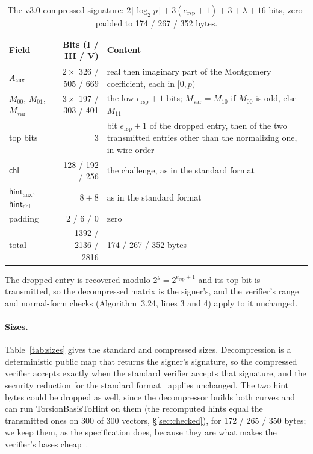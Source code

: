 \documentclass[version=submission]{iacrcc}
\newcommand{\ers}{e_{\mathrm{rsp}}}
\begin{document}
\begin{table}[H]
\centering
\caption{The v3.0 compressed signature: $2 \lceil \log_2 p \rceil + 3
(\ers + 1) + 3 + \lambda + 16$ bits, zero-padded to 174 / 267 / 352 bytes.}
\label{tab:layout3}
\footnotesize
\begin{tabular}{l r p{5.6cm}}
\toprule
\textbf{Field} & \textbf{Bits (I / III / V)} & \textbf{Content} \\
\midrule
$A_{\mathrm{aux}}$ & $2 \times$ 326 / 505 / 669 & real then imaginary part of the Montgomery coefficient, each in $[0, p)$ \\
$M_{00}$, $M_{01}$, $M_{\mathrm{var}}$ & $3 \times$ 197 / 303 / 401 & the low $\ers + 1$ bits; $M_{\mathrm{var}} = M_{10}$ if $M_{00}$ is odd, else $M_{11}$ \\
top bits & 3 & bit $\ers + 1$ of the dropped entry, then of the two transmitted entries other than the normalizing one, in wire order \\
$\mathsf{chl}$ & 128 / 192 / 256 & the challenge, as in the standard format \\
$\mathsf{hint}_{\mathrm{aux}}$, $\mathsf{hint}_{\mathrm{chl}}$ & $8 + 8$ & as in the standard format \\
padding & 2 / 6 / 0 & zero \\
\midrule
total & 1392 / 2136 / 2816 & 174 / 267 / 352 bytes \\
\bottomrule
\end{tabular}
\end{table}

The dropped entry is recovered modulo $2^g = 2^{\ers + 1}$ and its top
bit is transmitted, so the decompressed matrix is the signer's, and the verifier's range and normal-form checks (Algorithm~3.24, lines 3 and 4) apply to it unchanged.

\paragraph{Sizes.}
Table~\ref{tab:sizes} gives the standard and compressed sizes.
Decompression is a deterministic public map that returns the signer's signature, so the compressed verifier accepts exactly when the standard verifier accepts that signature, and the security reduction for the standard format~\cite{sqisign-security} applies unchanged.
The two hint bytes could be dropped as well, since the decompressor builds both curves and can run TorsionBasisToHint on them (the recomputed hints equal the transmitted ones on 300 of 300 vectors, \S\ref{sec:checked}), for 172 / 265 / 350 bytes; we keep them, as the specification does, because they are what makes the verifier's bases cheap~\cite[Section~3.4.3]{sqisign-spec-r3}.
\end{document}
